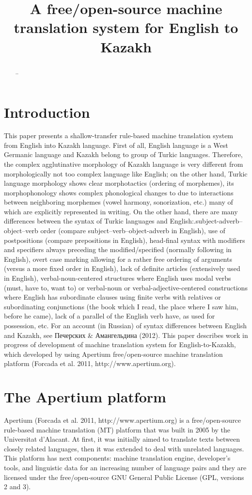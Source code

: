 \documentclass[11pt]{article}
\title{A free/open-source machine translation system for English to Kazakh}
\date{}
\begin{document}
\maketitle 

\begin{abstract}
..
\end{abstract}

\section{Introduction}

This paper presents a shallow-transfer rule-based machine translation system from English into Kazakh language. First of all, English language is a West Germanic language and Kazakh belong to group of Turkic languages. Therefore, the complex agglutinative morphology of Kazakh language is very different from morphologically not too complex language like English; on the other hand, Turkic language morphology shows clear morphotactics (ordering of morphemes), its morphophonology shows complex phonological changes to due to interactions between neighboring morphemes (vowel harmony, sonorization, etc.) many of which are explicitly represented in writing.
On the other hand, there are many differences between the syntax of Turkic languages and English:.subject-adverb–object–verb order (compare subject–verb–object-adverb in English), use of postpositions (compare prepositions in English), head-final syntax with modifiers and specifiers always preceding the modified/specified (normally following in English), overt case marking allowing for a rather free ordering of arguments (versus a more fixed order in English), lack of definite articles (extensively used in English), verbal-noun-centered structures where English uses modal verbs (must, have to, want to) or verbal-noun or verbal-adjective-centered constructions where English has subordinate clauses using finite verbs with relatives or subordinating conjunctions (the book which I read, the place where I saw him, before he came), lack of a parallel of the English verb have, as used for possession, etc. For an account (in Russian) of syntax differences between English and Kazakh, see Печерских \& Амангельдина (2012).
This paper describes work in progress of development of machine translation system for English-to-Kazakh, which developed by using Apertium free/open-source machine translation platform (Forcada et al. 2011, http://www.apertium.org). 

\section{The Apertium platform}
Apertium (Forcada et al. 2011, http://www.apertium.org) is a free/open-source rule-based machine translation (MT) platform that was built in 2005 by the Universitat d’Alacant. At first, it was initially aimed to translate texts between closely related languages, then it was extended to deal with unrelated languages. This platform has next components: machine translation engine, developer’s tools, and linguistic data for an increasing number of language pairs and they are licensed under the free/open-source GNU General Public License (GPL, versions 2 and 3).
\end{document}
